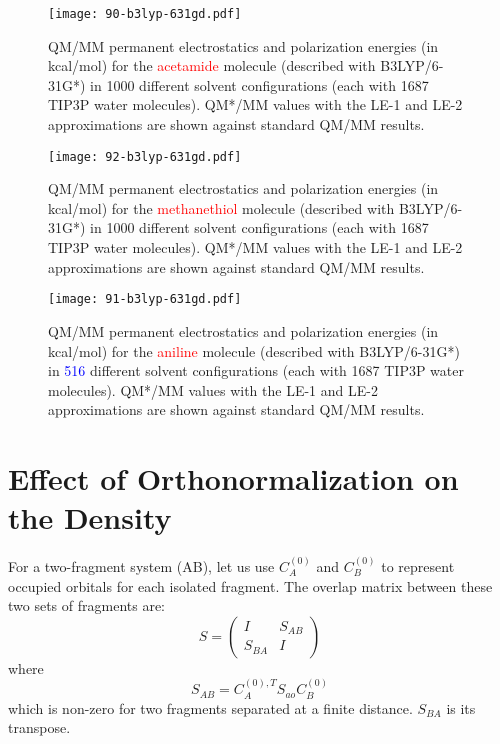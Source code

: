 \documentclass[aip,jcp,preprint,superscriptaddress,amsmath,amssymb]{revtex4-1}
\begin{document}
\begin{figure}
\caption{QM/MM permanent electrostatics and polarization energies (in kcal/mol) for the \textcolor{red}{acetamide} molecule (described with B3LYP/6-31G*) in 1000 different solvent configurations (each with 1687 TIP3P water molecules).   
QM*/MM values with the LE-1 and LE-2 approximations are shown against standard QM/MM results. }
\begin{center}
\texttt{[image: 90-b3lyp-631gd.pdf]}
\end{center}
\end{figure}

\begin{figure}
\caption{QM/MM permanent electrostatics and polarization energies (in kcal/mol) for the \textcolor{red}{methanethiol} molecule (described with B3LYP/6-31G*) in 1000 different solvent configurations (each with 1687 TIP3P water molecules).   
QM*/MM values with the LE-1 and LE-2 approximations are shown against standard QM/MM results. }
\begin{center}
\texttt{[image: 92-b3lyp-631gd.pdf]}
\end{center}
\end{figure}

\begin{figure}
\caption{QM/MM permanent electrostatics and polarization energies (in kcal/mol) for the \textcolor{red}{aniline} molecule (described with B3LYP/6-31G*) in \textcolor{blue}{516} different solvent configurations (each with 1687 TIP3P water molecules).   
QM*/MM values with the LE-1 and LE-2 approximations are shown against standard QM/MM results. }
\begin{center}
\texttt{[image: 91-b3lyp-631gd.pdf]}
\end{center}
\end{figure}


\clearpage
\section{Effect of Orthonormalization on the Density}

For a two-fragment system (AB), let us use $C_A^{(0)}$ and  $C_B^{(0)}$ to represent occupied orbitals for each isolated fragment.   
The overlap matrix between these two sets of fragments are:
\begin{equation}
S = \begin{pmatrix}
I & S_{AB} \\ 
S_{BA} & I 
\end{pmatrix}
\end{equation}
where 
\begin{equation}
S_{AB} = C_A^{(0),T} S_{ao} C_B^{(0)}
\end{equation}
which is non-zero for two fragments separated at a finite distance.  $S_{BA}$ is its transpose. 
\end{document}
